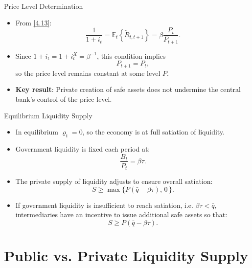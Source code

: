 \documentclass[11pt,aspectratio=169]{beamer}
\newcommand{\E}{\mathbb{E}}
\begin{document}
\begin{frame}{Price Level Determination}
\small
\begin{itemize}

\item From \eqref{4.13}:
\[
\frac{1}{1+i_t} = \E_t\!\left\{ \tilde{R}_{t,t+1} \right\}
= \beta \frac{P_t}{P_{t+1}}.
\]

\item Since $1+i_t = 1+i_t^X = \beta^{-1}$, this condition implies
\[
P_{t+1} = P_t,
\]
so the price level remains constant at some level $P$.

\item \textbf{Key result}: Private creation of safe assets does not undermine the central bank’s control of the price level.

\end{itemize}
\end{frame}




\begin{frame}{Equilibrium Liquidity Supply}
\small
\begin{itemize}

\item In equilibrium $\varrho_t = 0$, so the economy is at full satiation of liquidity.

\vspace{0.4em}

\item Government liquidity is fixed each period at:
\[
\frac{B_t}{P_t} = \beta \tau.
\]

\vspace{0.4em}

\item The private supply of liquidity adjusts to ensure overall satiation:
\[
S \ge \max\{ P(\bar{q} - \beta \tau),\, 0 \,\}.
\]

\vspace{0.4em}

\item If government liquidity is insufficient to reach satiation, i.e. $\beta \tau < \bar{q},
$
intermediaries have an incentive to issue additional safe assets so that:  
\[
S \ge P(\bar{q} - \beta \tau).
\]

\end{itemize}
\end{frame}

\section{Public vs. Private Liquidity Supply}
\end{document}

